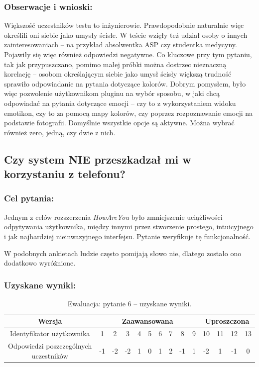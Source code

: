 	\subsubsection{Obserwacje i wnioski:}
	
	Większość uczestników testu to inżynierowie. Prawdopodobnie naturalnie więc określili oni siebie jako umysły ścisłe. W teście wzięły też udział osoby o innych zainteresowaniach -- na przykład absolwentka ASP czy studentka medycyny. Pojawiły się więc również odpowiedzi negatywne. Co kluczowe przy tym pytaniu, tak jak przypuszczano, pomimo małej próbki można dostrzec nieznaczną korelację -- osobom określającym siebie jako umysł ścisły większą trudność sprawiło odpowiadanie na pytania dotyczące kolorów. Dobrym pomysłem, było więc pozwolenie użytkownikom pluginu na wybór sposobu, w jaki chcą odpowiadać na pytania dotyczące emocji -- czy to z wykorzystaniem widoku emotikon, czy to za pomocą mapy kolorów, czy poprzez rozpoznawanie emocji na podstawie fotografii. Domyślnie wszystkie opcje są aktywne. Można wybrać również zero, jedną, czy dwie z nich.
	
	
\subsection{Czy system NIE przeszkadzał mi w korzystaniu z telefonu?}
	
	\subsubsection{Cel pytania:}
	
	Jednym z celów rozszerzenia \textit{HowAreYou} było zmniejszenie uciążliwości odpytywania użytkownika, między innymi przez stworzenie prostego, intuicyjnego i jak najbardziej nieinwazyjnego interfejsu. Pytanie weryfikuje tę funkcjonalność.
	
	W podobnych ankietach ludzie często pomijają słowo nie, dlatego zostało ono dodatkowo wyróżnione.
	
	\subsubsection{Uzyskane wyniki:}
	
	\begin{table}[!h]
		\caption{Ewaluacja: pytanie 6 -- uzyskane wyniki.}
		\centering
		\begin{tabular}{|c|c|c|c|c|c|c|c|c|c|c|c|c|c|}
			\hline
			Wersja &  \multicolumn{9}{c|}{Zaawansowana} & \multicolumn{4}{c|}{Uproszczona}\\ \hline
			Identyfikator użytkownika             & 1 & 2 & 3 & 4 & 5 & 6 & 7 & 8 & 9 
			& 10 & 11 & 12 & 13 \\ \hline
			Odpowiedzi poszczególnych uczestników & -1 & -2 & -2 & 1 & 0 & 1 & 2 & -1 & 1
			& -2 & 1 & -1 & 0     \\ \hline
		\end{tabular}
	\end{table}
	
